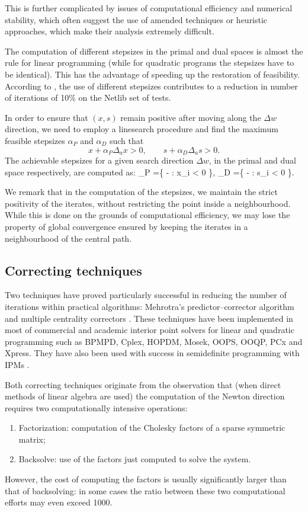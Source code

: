 This is further complicated by issues of computational efficiency
and numerical stability, which often suggest the use of amended
techniques or heuristic approaches, which make their analysis
extremely difficult.

The computation of different stepsizes in the primal and dual spaces is
almost the rule for linear programming (while for quadratic programs
the stepsizes have to be identical). This has the advantage of
speeding up the restoration of feasibility. According to
\cite{GondzioTerlaky}, the use of different stepsizes contributes 
to a reduction in number of iterations of 10\% on the Netlib
set of tests.

In order to ensure that $(x,s)$ remain positive after moving along the
$\Delta w$ direction, we need to employ a linesearch procedure 
and find the maximum feasible stepsizes $\alpha_P$ and $\alpha_D$ 
such that
\[
  x + \alpha_P \Delta_a x > 0, \qquad  s + \alpha_D \Delta_a s > 0.
\]
The achievable stepsizes for a given search direction $\Delta w$, 
in the primal and dual space respectively, are computed as:
\be  \label{eq:Alphas}
  \alpha_P =\min \left\{ - : \Delta x_i < 0 \right\},
  \quad\;
  \alpha_D =\min \left\{ - : \Delta s_i < 0 \right\}.
\ee

We remark that in the computation of the stepsizes, we 
maintain the strict positivity of the iterates, without restricting
the point inside a neighbourhood.
While this is done on the grounds of computational efficiency, we may
lose the property of global convergence ensured by keeping the
iterates in a neighbourhood of the central path.

%
%
\subsection{Correcting techniques}

Two techniques have proved particularly successful in reducing 
the number of iterations within practical algorithms:
Mehrotra's predictor--corrector algorithm \cite{Mehrotra92} 
and multiple centrality correctors \cite{Gondzio96}. These 
techniques have been implemented in most of commercial and academic 
interior point solvers for linear and quadratic programming such 
as BPMPD, Cplex, HOPDM, Mosek, OOPS, OOQP, PCx and Xpress. 
They have also been used with success in semidefinite 
programming with IPMs \cite{Haeberly99}.

Both correcting techniques originate from the observation that 
(when direct methods of linear algebra are used) the computation 
of the Newton direction requires two computationally intensive
operations: 
\begin{enumerate}
\item Factorization: computation of the Cholesky factors of a sparse 
symmetric matrix; 
\item Backsolve: use of the factors just computed to solve the system. 
\end{enumerate}
However, the cost of computing the factors is usually significantly 
larger than that of backsolving: in some cases the ratio between 
these two computational efforts may even exceed 1000. 


